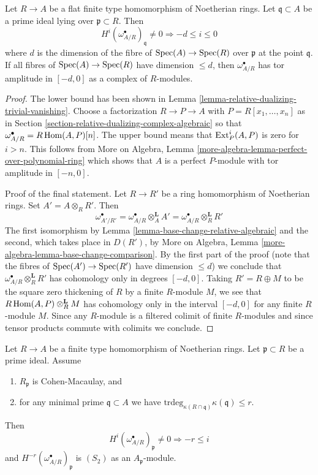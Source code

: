 \begin{lemma}
\label{lemma-relative-dualizing-flat-vanishing}
Let $R \to A$ be a flat finite type homomorphism of Noetherian rings.
Let $\mathfrak q \subset A$ be a prime ideal lying over
$\mathfrak p \subset R$. Then
$$
H^i(\omega_{A/R}^\bullet)_\mathfrak q \not = 0
\Rightarrow - d \leq i \leq 0
$$
where $d$ is the dimension of the fibre of $\mathop{\mathrm{Spec}}(A) \to \mathop{\mathrm{Spec}}(R)$
over $\mathfrak p$ at the point $\mathfrak q$. If all fibres of
$\mathop{\mathrm{Spec}}(A) \to \mathop{\mathrm{Spec}}(R)$ have dimension $\leq d$, then
$\omega_{A/R}^\bullet$ has tor amplitude in $[-d, 0]$
as a complex of $R$-modules.
\end{lemma}

\begin{proof}
The lower bound has been shown in
Lemma \ref{lemma-relative-dualizing-trivial-vanishing}.
Choose a factorization $R \to P \to A$ with $P = R[x_1, \ldots, x_n]$
as in Section \ref{section-relative-dualizing-complex-algebraic}
so that $\omega_{A/R}^\bullet = R\mathop{\mathrm{Hom}}\nolimits(A, P)[n]$.
The upper bound means that $\mathop{\mathrm{Ext}}\nolimits^i_P(A, P)$ is zero for $i > n$.
This follows from
More on Algebra, Lemma \ref{more-algebra-lemma-perfect-over-polynomial-ring}
which shows that $A$ is a perfect $P$-module with
tor amplitude in $[-n, 0]$.

\medskip\noindent
Proof of the final statement. Let $R \to R'$ be a ring homomorphism
of Noetherian rings. Set $A' = A \otimes_R R'$. Then
$$
\omega_{A'/R'}^\bullet =
\omega_{A/R}^\bullet \otimes_A^\mathbf{L} A' =
\omega_{A/R}^\bullet \otimes_R^\mathbf{L} R'
$$
The first isomorphism by Lemma \ref{lemma-base-change-relative-algebraic}
and the second, which takes place in $D(R')$, by
More on Algebra, Lemma \ref{more-algebra-lemma-base-change-comparison}.
By the first part of the proof
(note that the fibres of $\mathop{\mathrm{Spec}}(A') \to \mathop{\mathrm{Spec}}(R')$ have dimension $\leq d$)
we conclude that $\omega_{A/R}^\bullet \otimes_R^\mathbf{L} R'$
has cohomology only in degrees $[-d, 0]$. Taking $R' = R \oplus M$
to be the square zero thickening of $R$ by a finite $R$-module $M$,
we see that $R\mathop{\mathrm{Hom}}\nolimits(A, P) \otimes_R^\mathbf{L} M$
has cohomology only in the interval $[-d, 0]$ for any finite $R$-module $M$.
Since any $R$-module is a filtered colimit of finite $R$-modules
and since tensor products commute with colimits we conclude.
\end{proof}

\begin{lemma}
\label{lemma-relative-dualizing-CM-vanishing}
Let $R \to A$ be a finite type homomorphism of Noetherian rings.
Let $\mathfrak p \subset R$ be a prime ideal. Assume
\begin{enumerate}
\item $R_\mathfrak p$ is Cohen-Macaulay, and
\item for any minimal prime $\mathfrak q \subset A$ we have
$\text{trdeg}_{\kappa(R \cap \mathfrak q)} \kappa(\mathfrak q) \leq r$.
\end{enumerate}
Then
$$
H^i(\omega_{A/R}^\bullet)_\mathfrak p \not = 0 \Rightarrow - r \leq i
$$
and $H^{-r}(\omega_{A/R}^\bullet)_\mathfrak p$ is $(S_2)$
as an $A_\mathfrak p$-module.
\end{lemma}

